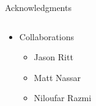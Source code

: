 \documentclass[bigger]{beamer}
\begin{document}
{\begin{frame}{Acknowledgments}
\begin{columns}[T]
        \begin{column}{0.5\textwidth}
            \begin{itemize}
                \small
                \item Collaborations
                \begin{itemize}
                    \tiny
                    \item Jason Ritt
                    \item Matt Nassar
                    \item Niloufar Razmi
                \end{itemize}
            \end{itemize}
        \end{column}
    \end{columns}
\end{frame}
}
\end{document}

